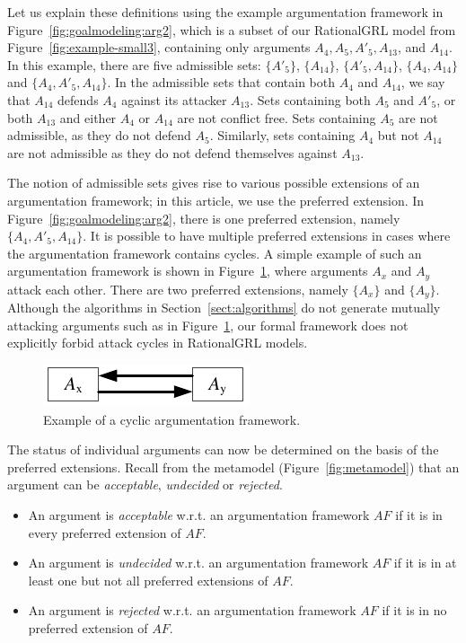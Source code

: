 Let us explain these definitions using the example argumentation framework in Figure~\ref{fig:goalmodeling:arg2}, which is a subset of our RationalGRL model from Figure~\ref{fig:example-small3}, containing only arguments $A_4, A_{5},A'_{5},A_{13}$, and $A_{14}$. In this example, there are five admissible sets: $\{A'_{5}\}$, $\{A_{14}\}$, $\{A'_{5},A_{14}\}$, $\{A_4, A_{14}\}$ and $\{A_4, A'_5, A_{14}\}$. In the admissible sets that contain both $A_{4}$ and $A_{14}$, we say that $A_{14}$ defends $A_4$ against its attacker $A_{13}$. Sets containing both $A_{5}$ and $A'_{5}$, or both $A_{13}$ and either $A_4$ or $A_{14}$ are not conflict free. Sets containing $A_5$ are not admissible, as they do not defend $A_5$. Similarly, sets containing $A_4$ but not $A_{14}$ are not admissible as they do not defend themselves against $A_{13}$. 

The notion of admissible sets gives rise to various possible extensions of an argumentation framework; in this article, we use the preferred extension. In Figure~\ref{fig:goalmodeling:arg2}, there is one preferred extension, namely $\{A_4, A'_5, A_{14}\}$. It is possible to have multiple preferred extensions in cases where the argumentation framework contains cycles. A simple example of such an argumentation framework is shown in Figure~\ref{fig:goalmodeling:arg3}, where arguments $A_x$ and $A_y$ attack each other. There are two preferred extensions, namely $\{A_x\}$ and $\{A_y\}$. Although the algorithms in Section~\ref{sect:algorithms} do not generate mutually attacking arguments such as in Figure~\ref{fig:goalmodeling:arg3}, our formal framework does not explicitly forbid attack cycles in RationalGRL models.

\begin{figure}[b]
\centering
\includegraphics[]{img/example-mutual-attack.pdf}
\caption{Example of a cyclic argumentation framework.}
\label{fig:goalmodeling:arg3}
\end{figure}

The status of individual arguments can now be determined on the basis of the preferred extensions. Recall from the metamodel (Figure~\ref{fig:metamodel}) that an argument can be \emph{acceptable}, \emph{undecided} or \emph{rejected}. 

\begin{definition} 
\label{def:acceptability}
\begin{itemize}
\item An argument is \emph{acceptable} w.r.t. an argumentation framework $AF$ if it is in every preferred extension of $AF$. 
\item An argument is \emph{undecided} w.r.t. an argumentation framework $AF$ if it is in at least one but not all preferred extensions of $AF$. 
\item An argument is \emph{rejected} w.r.t. an argumentation framework $AF$ if it is in no preferred extension of $AF$. 
\end{itemize}
\end{definition}

